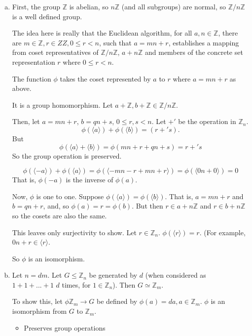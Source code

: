\documentclass[11pt,oneside]{article}
\numberwithin{equation}{section}
\theoremstyle{definition}
\def\ZZ{\mathbb{Z}}
\begin{document}
\begin{solution}
  \begin{enumerate}[(a)]
  \item
    First, the group $\ZZ$ is abelian, so $n\ZZ$ (and all subgroups)
    are normal, so $\ZZ / n\ZZ$ is a well defined group.  
    
    The idea here is really that the Euclidean algorithm, for all $a,
    n \in \ZZ$, there are $m \in \ZZ, r \in ZZ, 0 \leq r < n$, such
    that $ a = m n + r$, establishes a mapping from coset representatives of $ \ZZ / n\ZZ$,
    $a + n\ZZ$ and members of the concrete set representation $ r$ where $ 0 \leq r < n$.  
    
    The function $\phi$ takes the coset represented by $a$ to $r$ where $a = mn +r$ as above. 

    It is a group homomorphism.  Let $a + \ZZ, b + \ZZ \in \ZZ / n\ZZ$.

\def\pmod{+'}
    Then, let $ a = mn + r$, $b = qn + s$, $ 0 \leq r, s < n$.  Let $\pmod$ be the operation in $\ZZ_n$. 
    $$
    \phi (\langle a \rangle) + \phi(\langle b \rangle) = (r \pmod s). 
    $$
    But
    $$ \phi(\langle a \rangle + \langle b \rangle ) = \phi (mn + r + qn + s) = r \pmod s
    $$
    So the group operation is preserved. 

    $$ \phi (\langle -a \rangle) + \phi (\langle a \rangle ) = \phi (\langle -mn - r + mn + r \rangle) = \phi(\langle 0n + 0 \rangle ) = 0
    $$
    That is, $\phi(-a)$ is the inverse of $\phi(a)$.

    Now, $\phi$ is one to one. Suppose $\phi(\langle a \rangle ) =
    \phi(\langle b \rangle )$.  That is, $a = mn +r$ and $b = qn + r$,
    and, so $\phi(a) = r = \phi(b)$. But then $r \in a + n\ZZ $ and $
    r \in b + n \ZZ$ so the cosets are also the same.

    This leaves only surjectivity to show.  Let $r \in \ZZ_n$.  $\phi(\langle r \rangle) = r$.  (For example,
    $0 n + r \in \langle r \rangle$.

    So $\phi$ is an isomorphism.  
    
  \item
    Let $n = d m$.  Let $G \leq \ZZ_n$ be generated by $d$ (when considered as 
    $1 + 1 + ... + 1$ $d$ times, for $1 \in \ZZ_n$).  Then $G \simeq \ZZ_m$.

    To show this, let $\phi \ZZ_m \to G$ be defined by $\phi(a) = da, a \in \ZZ_m$. $\phi$ is an
    isomorphism from $G$ to $\ZZ_m$.  

    \begin{itemize}
    \item
      Preserves group operations


\end{itemize}
\end{enumerate}
\end{solution}
\end{document}
